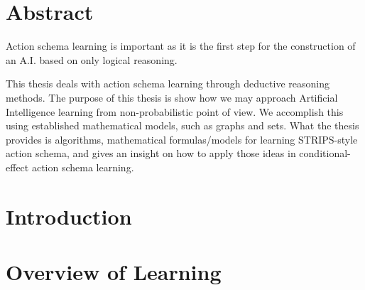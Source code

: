 \documentclass[10pt,twoside]{book}                  %
\theoremstyle{definition}
\theoremstyle{plain}
\begin{document}
\prefrontmatter
\frontmatter
{}     
\chapter{Abstract}
 
 Action schema learning is important as it is the first step for the construction of an A.I. based on only logical reasoning. 

This thesis deals with action schema learning through deductive reasoning methods.
The purpose of this thesis is show how we may approach Artificial Intelligence learning from non-probabilistic point of view. 
We accomplish this using established mathematical models, such as graphs and sets. 
What the thesis provides is algorithms, mathematical formulas/models for learning STRIPS-style action schema, and gives an insight on how to apply those ideas in conditional-effect action schema learning.



\markboth{}{}                                       %
\markboth{}{}                                       %
\markboth{}{}                                       %
\markboth{}{}                                       %
\newpage\mbox{}\newpage
{}
\renewcommand{\sectionmark}[1]{\markright{#1}}
\sectionmark{Contents}
\addtolength{\parskip}{-\baselineskip}
\tableofcontents
\listofalgorithms
\addtolength{\parskip}{\baselineskip}
\renewcommand{\sectionmark}[1]{\markright{\thesection\ #1}}

\mainmatter
\chapter{Introduction}
	

\chapter{Overview of Learning} \label{sec:Learning}
    
\end{document}
